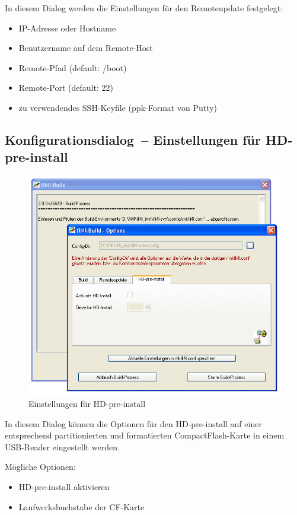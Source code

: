   In diesem Dialog werden die Einstellungen für den Remoteupdate festgelegt:
  \begin{itemize}
    \item IP-Adresse oder Hostname
    \item Benutzername auf dem Remote-Host
    \item Remote-Pfad (default: /boot)
    \item Remote-Port (default: 22)
    \item zu verwendendes SSH-Keyfile (ppk-Format von Putty)
  \end{itemize}

  \subsection{Konfigurationsdialog~-- Einstellungen für HD-pre-install}
  \begin{figure}[ht!]
  \centering
  \includegraphics[width=\columnwidth]{win_build_hd_install}
  \caption{Einstellungen für HD-pre-install}
  \label{fig:win_build_hd_install}
  \end{figure}

   In diesem Dialog können die Optionen für den HD-pre-install auf einer
   entsprechend partitionierten und formatierten CompactFlash-Karte
   in einem USB-Reader eingestellt werden.

   Mögliche Optionen:
   \begin{itemize}
     \item HD-pre-install aktivieren
     \item Laufwerksbuchstabe der CF-Karte
  \end{itemize}

